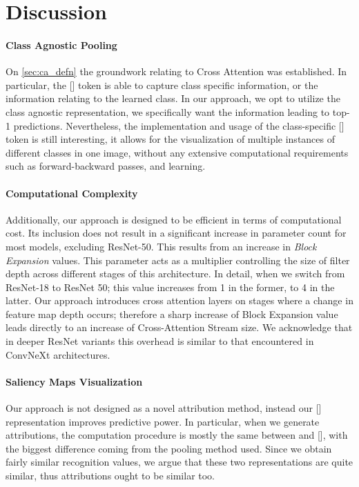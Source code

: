 \section{Discussion}
\label{sec:ca_discussion}
\paragraph{Class Agnostic Pooling} On \autoref{sec:ca_defn} the groundwork relating to Cross 
Attention was established. In particular, the [] token is able to capture class specific 
information, or the information relating to the learned class. In our approach, we opt to utilize 
the class agnostic representation, we specifically want the information leading to 
top-1 predictions. Nevertheless, the implementation and usage of the class-specific [] 
token is still interesting, it allows for the visualization of multiple instances of different 
classes in one image, without any extensive computational requirements such as forward-backward 
passes, and learning.

\paragraph{Computational Complexity} Additionally, our approach is designed to be efficient in terms of 
computational cost. Its inclusion does not result in a significant increase in parameter count 
for most models, excluding ResNet-50. This results from an increase in \emph{Block Expansion} 
values. This parameter acts as a multiplier controlling the size of filter depth across different 
stages of this architecture. In detail, when we switch from ResNet-18 to ResNet 50; this value 
increases from 1 in the former, to 4 in the latter. Our approach introduces cross attention layers 
on stages where a change in feature map depth occurs; therefore a sharp increase of Block Expansion 
value leads directly to an increase of Cross-Attention Stream size. We acknowledge that in deeper
 ResNet variants this overhead is similar to that encountered in ConvNeXt architectures.

\paragraph{Saliency Maps Visualization} Our approach is not designed as a novel attribution method, 
instead our [\cls] representation improves predictive power. In particular, when we generate 
attributions, the computation procedure is mostly the same between \gap and [\cls], with the 
biggest difference coming from the pooling method used. Since we obtain fairly similar recognition 
values, we argue that these two representations are quite similar, thus attributions ought to be 
similar too. 

